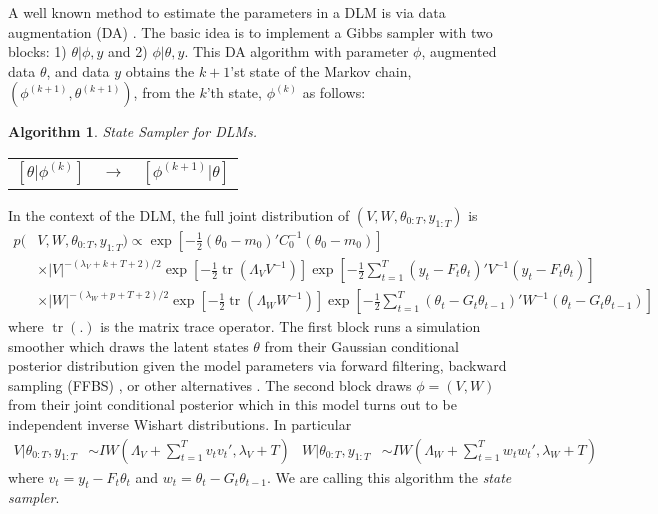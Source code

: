 \documentclass{article}
\newtheorem{alg}{Algorithm}
\DeclareMathOperator{\tr}{tr}
\begin{document}
A well known method to estimate the parameters in a DLM is via data augmentation (DA) \cite{fruhwirth1994data,carter1994gibbs}. The basic idea is to implement a Gibbs sampler with two blocks: 1) $\theta|\phi,y$ and 2) $\phi|\theta,y$. This DA algorithm with parameter $\phi$, augmented data $\theta$, and data $y$ obtains the $k+1$'st state of the Markov chain, $(\phi^{(k+1)},\theta^{(k+1)})$, from the $k$'th state, $\phi^{(k)}$ as follows:
\begin{alg}State Sampler for DLMs.\label{alg:state}\\
  \begin{center}
    \begin{tabular}{lll}
      $[\theta|\phi^{(k)}]$& $\to$& $[\phi^{(k+1)}|\theta]$
    \end{tabular}
  \end{center}
\noindent \end{alg}
In the context of the DLM, the full joint distribution of $(V,W,\theta_{0:T},y_{1:T})$ is
\begin{align}
  p(&V,W,\theta_{0:T},y_{1:T}) \propto \exp\left[-\frac{1}{2}(\theta_0-m_0)'C_0^{-1}(\theta_0-m_0)\right] \nonumber\\
  &\times   |V|^{-(\lambda_V + k + T + 2)/2}\exp\left[-\frac{1}{2}\tr\left(\Lambda_VV^{-1}\right)\right] \exp\left[-\frac{1}{2}\sum_{t=1}^T(y_t - F_t\theta_t)'V^{-1}(y_t - F_t\theta_t)\right] \nonumber\\
   & \times |W|^{-(\lambda_W + p + T + 2)/2}\exp\left[-\frac{1}{2}\tr\left(\Lambda_WW^{-1}\right)\right]\exp\left[-\frac{1}{2}\sum_{t=1}^T(\theta_t-G_t\theta_{t-1})'W^{-1}(\theta_t-G_t\theta_{t-1})\right]\label{dlmjoint}
 \end{align}
where $\tr(.)$ is the matrix trace operator. The first block runs a simulation smoother which draws the latent states $\theta$ from their Gaussian conditional posterior distribution given the model parameters via forward filtering, backward sampling (FFBS) \cite{fruhwirth1994data,carter1994gibbs}, or other alternatives \cite{koopman1993disturbance,de1995simulation,mccausland2011simulation}. The second block draws $\phi=(V,W)$ from their joint conditional posterior which in this model turns out to be independent inverse Wishart distributions. In particular
\begin{align}
  V|\theta_{0:T},y_{1:T} &\sim IW\left(\Lambda_V + \sum_{t=1}^Tv_tv_t',\lambda_V + T\right) &
  W|\theta_{0:T},y_{1:T} &\sim IW\left(\Lambda_W + \sum_{t=1}^Tw_tw_t',\lambda_{W} + T\right) \label{eq:VWcond}
\end{align}
where $v_t = y_t - F_t\theta_t$ and $w_t = \theta_t - G_t\theta_{t-1}$. We are calling this algorithm the {\it state sampler}.
\end{document}
